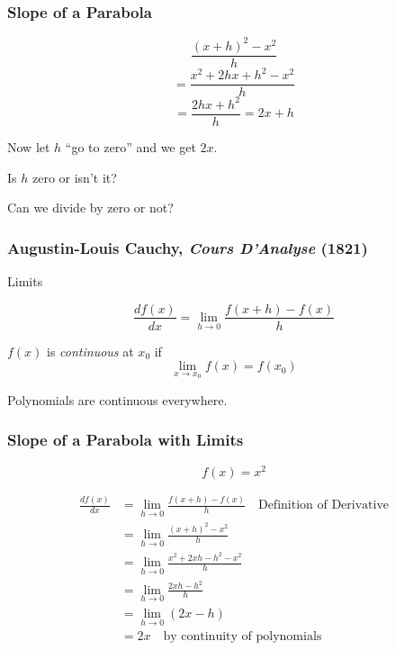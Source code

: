 \documentclass{beamer}
\begin{document}
\begin{frame}
\frametitle{Slope of a Parabola}

\noindent{}


\[ \frac{(x+h)^2 - x^2}{h} \]
\[ = \frac{x^2+2hx+h^2-x^2}{h} \]
\[ = \frac{2hx+h^2}{h} = 2x + h \]

\begin{center}

Now let $h$ ``go to zero'' and we get $2x$.

\vskip 12pt

Is $h$ zero or isn't it?

\vskip 12pt

Can we divide by zero or not?
\end{center}
\end{frame}

\begin{frame}
\frametitle{Augustin-Louis Cauchy, {\it Cours D'Analyse} (1821)}

Limits

\begin{definition}[Derivative]
\[ \frac{df(x)}{dx} = \lim_{h\to 0} \frac{f(x+h) - f(x)}{h} \]
\end{definition}

\begin{definition}[Continuity]
$f(x)$ is {\it continuous} at $x_0$ if
\[ \lim_{x\to x_0} f(x) = f(x_0) \]
\end{definition}

\begin{theorem}
Polynomials are continuous everywhere.
\end{theorem}

\end{frame}

\begin{frame}
\frametitle{Slope of a Parabola with Limits}
\[ f(x) = x^2 \]

\begin{align*}
\frac{d f(x)}{dx} & = \lim_{h\to 0} \frac{f(x+h) - f(x)}{h} \quad \text{Definition of Derivative} \\
& = \lim_{h\to 0} \frac{(x+h)^2 - x^2}{h} \\
& = \lim_{h\to 0} \frac{x^2+2xh-h^2-x^2}{h} \\
& = \lim_{h\to 0} \frac{2xh-h^2}{h} \\
& = \lim_{h\to 0} (2x-h) \\
& = 2x \quad \text{by continuity of polynomials} \\
\end{align*}

\end{frame}
\end{document}
